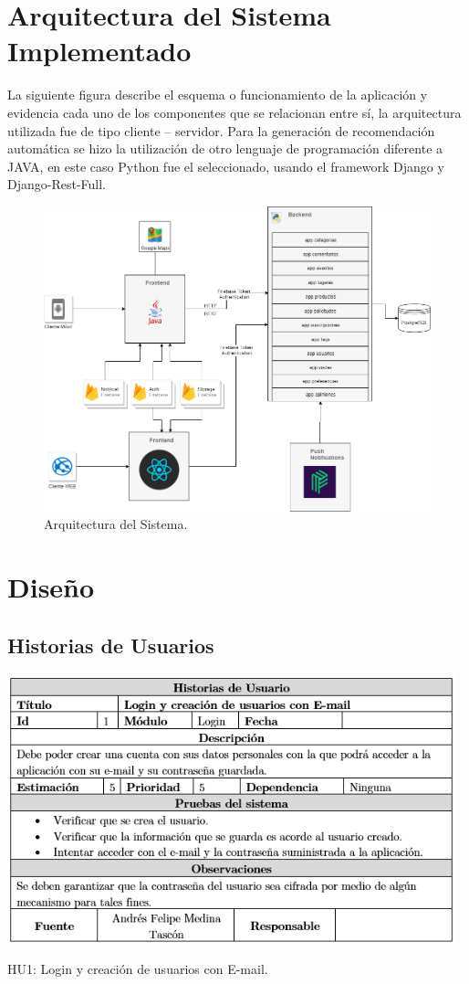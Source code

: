 \documentclass[12pt,letterpaper,openany]{book}
\begin{document}
\section{Arquitectura del Sistema Implementado}
La siguiente figura describe el esquema o funcionamiento de la aplicación y evidencia cada uno de los componentes que se relacionan entre sí, la arquitectura utilizada fue de tipo cliente – servidor. Para la generación de recomendación automática se hizo la utilización de otro lenguaje de programación diferente a JAVA, en este caso Python fue el seleccionado, usando el framework Django y Django-Rest-Full.
\begin{figure}[H]
\begin{center}
\includegraphics[width=13cm]{./imagenes/arquitectura}
\caption{Arquitectura del Sistema.}
\end{center}
\end{figure}

\section{Diseño}
\subsection{Historias de Usuarios}
\begin{table}[H]
\centering
\includegraphics[width=13cm]{./imagenes/HU/HU1}
\caption{HU1: Login y creación de usuarios con E-mail.}
\end{table}
\end{document}
